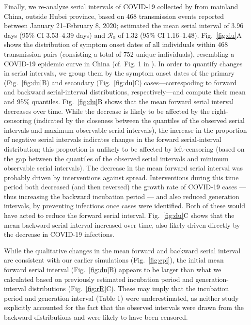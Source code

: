 \documentclass[12pt]{article}
\newcommand{\fref}[1]{Fig.~\ref{fig:#1}}
\newcommand{\Rx}[1]{\ensuremath{{\mathcal R}_{#1}}\xspace}
\newcommand{\Ro}{\Rx{0}}
\begin{document}
Finally, we re-analyze serial intervals of COVID-19 collected by \cite{du2020serial} from mainland China, outside Hubei province, based on 468 transmission events reported between January 21--February 8, 2020;
\cite{du2020serial} estimated the mean serial interval of 3.96 days (95\% CI 3.53–4.39 days) and \Ro of 1.32 (95\% CI 1.16–1.48).
\fref{du}A shows the distribution of symptom onset dates of all individuals within 468 transmission pairs (consisting a total of 752 unique individuals), resembling a COVID-19 epidemic curve in China (cf. Fig. 1 in \citep{pan2020jama}).
In order to quantify changes in serial intervals, we group them by the symptom onset dates of the primary (\fref{du}B) and secondary (\fref{du}C) cases---correspoding to forward and backward serial-interval distributions, respectively---and compute their mean and 95\% quantiles.
\fref{du}B shows that the mean forward serial interval decreases over time.
While the decrease is likely to be affected by the right-censoring (indicated by the closeness between the quantiles of the observed serial intervals and maximum observable serial intervals), the increase in the proportion of negative serial intervals indicates changes in the forward serial-interval distribution;
this proportion is unlikely to be affected by left-censoring (based on the gap between the quantiles of the observed serial intervals and minimum observable serial intervals).
The decrease in the mean forward serial interval was probably driven by interventions against spread.
Interventions during this time period both decreased (and then reversed) the growth rate of COVID-19 cases --- thus increasing the backward incubation period --- and also reduced generation intervals, by preventing infections once cases were identified.
Both of these would have acted to reduce the forward serial interval.
\fref{du}C shows that the mean backward serial interval increased over time, also likely driven directly by the decrease in COVID-19 infections.

While the qualitative changes in the mean forward and backward serial interval are consistent with our earlier simulations (\fref{epi}), the initial mean forward serial interval (\fref{du}B) appears to be larger than what we calculated based on previously estimated incubation period and generation-interval distributions (\fref{rR}C).
These may imply that the incubation period and generation interval (Table 1) were underestimated, as neither study explicitly accounted for the fact that the observed intervals were drawn from the backward distributions and were likely to have been censored.
\end{document}
